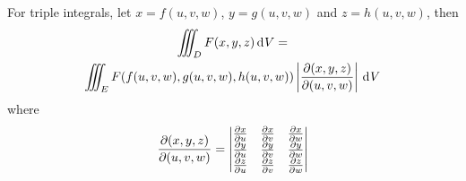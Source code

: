 \documentclass[10pt, twocolumn]{article}
\theoremstyle{remark}
\begin{document}
For triple integrals, let \(x = f(u, v, w)\), \(y = g(u, v, w)\) and \(z = h(u, v, w)\), then
\begin{multline*}
  \iiint_D {F(x, y, z) \,\mathrm{d}^{} V} = \\
  \iiint_E {F(f(u, v, w), g(u, v, w), h(u, v, w)) \left| \frac{\partial (x, y, z)}{\partial (u, v, w)} \right| \,\mathrm{d}^{} V}
\end{multline*}
where
\[
  \frac{\partial (x, y, z)}{\partial (u, v, w)} =
  \begin{vmatrix}
    \frac{\partial x}{\partial u} & \frac{\partial x}{\partial v} & \frac{\partial x}{\partial w} \\
    \frac{\partial y}{\partial u} & \frac{\partial y}{\partial v} & \frac{\partial y}{\partial w} \\
    \frac{\partial z}{\partial u} & \frac{\partial z}{\partial v} & \frac{\partial z}{\partial w}
  \end{vmatrix}
\]
\end{document}
